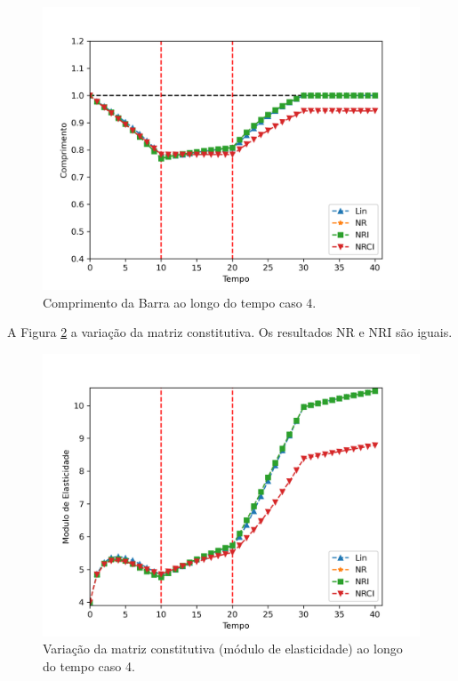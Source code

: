 \documentclass[12pt,a4paper]{article}
\begin{document}
\begin{figure}[H]
	\centering
	\includegraphics[width=1.0\textwidth]{caso4/desloc_caso4.png}
	\caption{Comprimento da Barra ao longo do tempo caso 4.}
	\label{fig:u_caso4}
\end{figure}

A Figura \ref{fig:modE_caso4} a variação da matriz constitutiva. Os resultados NR e NRI são iguais.

\begin{figure}[H]
	\centering
	\includegraphics[width=1.0\textwidth]{caso4/modE_caso4.png}
	\caption{Variação da matriz constitutiva (módulo de elasticidade) ao longo do tempo caso 4.}
	\label{fig:modE_caso4}
\end{figure}
\end{document}
